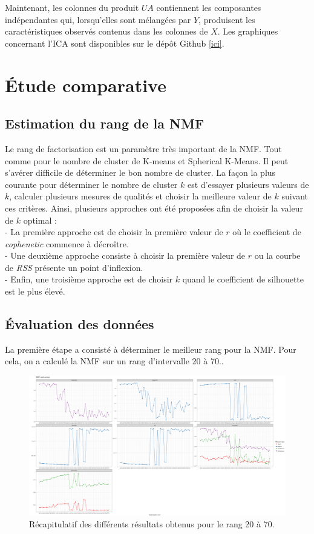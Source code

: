 \documentclass[runningheads]{llncs}
\begin{document}
Maintenant, les colonnes du produit $UA$ contiennent les composantes indépendantes qui, lorsqu'elles sont mélangées par $Y$, produisent les caractéristiques observés contenus dans les colonnes de $X$. Les graphiques concernant l'ICA sont disponibles sur le dépôt Github \href{https://github.com/mbenhamd/nmf-ter/tree/master/nmf_result}{[ici]}.

\section{\'Etude comparative}
\label{comparative}
\subsection{Estimation du rang de la NMF}

Le rang de factorisation est un paramètre très important de la NMF. Tout comme pour le nombre de cluster de K-means et Spherical K-Means. Il peut s'avérer difficile de déterminer le bon nombre de cluster. La façon la plus courante pour déterminer le nombre de cluster $k$ est d'essayer plusieurs valeurs de $k$, calculer plusieurs mesures de qualités et choisir la meilleure valeur de $k$ suivant ces critères. 
Ainsi, plusieurs approches ont été proposées afin de choisir la valeur de $k$ optimal : \\
 - La première approche est de choisir la première valeur de $r$ où le coefficient de \textit{cophenetic} commence à décroître. \\
 - Une deuxième approche consiste à choisir la première valeur de $r$ ou la courbe de \textit{RSS} présente un point d'inflexion. \\
 - Enfin, une troisième approche est de choisir $k$ quand le coefficient de silhouette est le plus élevé.


\subsection{\'Evaluation des donn\'ees}

La première étape a consisté à déterminer le meilleur rang pour la NMF. Pour cela, on a calculé la NMF sur un rang d'intervalle 20 à 70..

\begin{figure}[H]
\centering
\includegraphics[width=1\textwidth]{rank20-70.png}
\caption{Récapitulatif des différents résultats obtenus pour le rang 20 à 70.}
  \label{fig:recomposition}
\end{figure}
\end{document}
